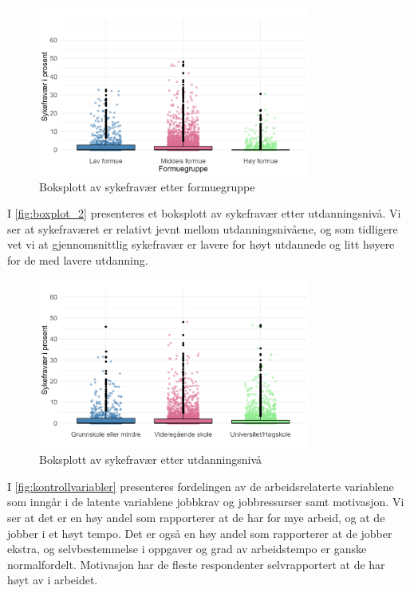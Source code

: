 \documentclass[
  12pt,
  a4paper,
  DIV=11,
  numbers=noendperiod]{scrartcl}
\begin{document}
\begin{figure}[H]
\caption{Boksplott av sykefravær etter formuegruppe}
\label{fig:boxplot}
\centering
\includegraphics[width=0.8\textwidth]{dokumentobjekter/figurer/fig_6.png}
\end{figure}

\newpage

I \autoref{fig:boxplot_2} presenteres et boksplott av sykefravær etter
utdanningsnivå. Vi ser at sykefraværet er relativt jevnt mellom
utdanningsnivåene, og som tidligere vet vi at gjennomsnittlig sykefravær
er lavere for høyt utdannede og litt høyere for de med lavere utdanning.

\vspace{-0.5cm}
\begin{figure}[H]
\caption{Boksplott av sykefravær etter utdanningsnivå}
\label{fig:boxplot_2}
\centering
\includegraphics[width=0.8\textwidth]{dokumentobjekter/figurer/fig_7.png}
\end{figure}
\vspace{-1cm}

I \autoref{fig:kontrollvariabler} presenteres fordelingen av de
arbeidsrelaterte variablene som inngår i de latente variablene jobbkrav
og jobbressurser samt motivasjon. Vi ser at det er en høy andel som
rapporterer at de har for mye arbeid, og at de jobber i et høyt tempo.
Det er også en høy andel som rapporterer at de jobber ekstra, og
selvbestemmelse i oppgaver og grad av arbeidstempo er ganske
normalfordelt. Motivasjon har de fleste respondenter selvrapportert at
de har høyt av i arbeidet.
\end{document}
